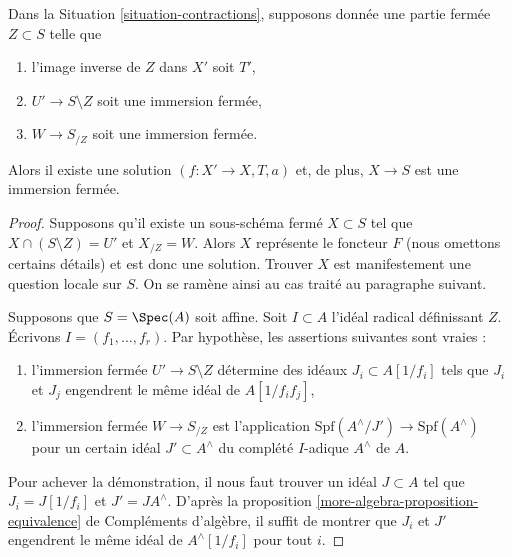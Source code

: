 \begin{lemma}
\label{lemma-closed-immersion}
Dans la Situation \ref{situation-contractions}, supposons donnée une partie
fermée $Z \subset S$ telle que
\begin{enumerate}
\item l'image inverse de $Z$ dans $X'$ soit $T'$,
\item $U' \to S \setminus Z$ soit une immersion fermée,
\item $W \to S_{/Z}$ soit une immersion fermée.
\end{enumerate}
Alors il existe une solution $(f : X' \to X, T, a)$
et, de plus, $X \to S$ est une immersion fermée.
\end{lemma}

\begin{proof}
Supposons qu'il existe un sous-schéma fermé $X \subset S$ tel que
$X \cap (S \setminus Z) = U'$ et $X_{/Z} = W$. Alors
$X$ représente le foncteur $F$ (nous omettons certains détails) et est donc
une solution. Trouver $X$ est manifestement une question locale sur $S$.
On se ramène ainsi au cas traité au paragraphe suivant.

\medskip\noindent
Supposons que $S = \Spec(A)$ soit affine. Soit $I \subset A$ l'idéal
radical définissant $Z$.
Écrivons $I = (f_1, \ldots, f_r)$. Par hypothèse, les assertions suivantes sont vraies :
\begin{enumerate}
\item l'immersion fermée $U' \to S \setminus Z$ détermine des
idéaux $J_i \subset A[1/f_i]$ tels que $J_i$ et $J_j$
engendrent le même idéal de $A[1/f_if_j]$,
\item l'immersion fermée $W \to S_{/Z}$ est l'application
$\text{Spf}(A^\wedge/J') \to \text{Spf}(A^\wedge)$ pour un certain
idéal $J' \subset A^\wedge$ du complété $I$-adique $A^\wedge$ de $A$.
\end{enumerate}
Pour achever la démonstration, il nous faut trouver un idéal $J \subset A$
tel que $J_i = J[1/f_i]$ et $J' = JA^\wedge$. D'après la
proposition \ref{more-algebra-proposition-equivalence} de Compléments d'algèbre,
il suffit de montrer que $J_i$ et $J'$ engendrent le même idéal
de $A^\wedge[1/f_i]$ pour tout $i$.


\end{proof}
